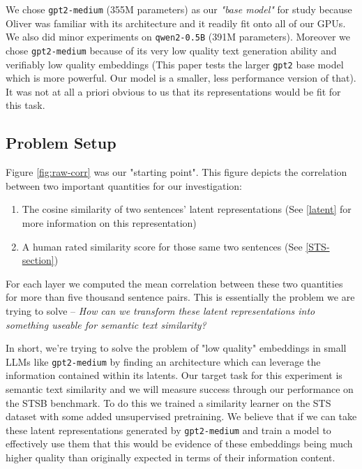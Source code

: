 \documentclass{article}
\begin{document}
\begin{enumerate}
\end{enumerate}
We chose \verb|gpt2-medium| (355M parameters) as our \textit{"base model"} for study because Oliver was familiar with its architecture and it readily fit onto all of our GPUs. We also did minor experiments on \verb|qwen2-0.5B| (391M parameters). Moreover we chose \verb|gpt2-medium| because of its very low quality text generation ability and verifiably low quality embeddings \cite{ethayarajh2019contextualcontextualizedwordrepresentations} (This paper tests the larger \verb|gpt2| base model which is more powerful. Our model is a smaller, less performance version of that). It was not at all a priori obvious to us that its representations would be fit for this task.


\subsection{Problem Setup} \label{Setup}
Figure \ref{fig:raw-corr} was our "starting point". This figure depicts the correlation between two important quantities for our investigation:
\begin{enumerate}
    \item The cosine similarity of two sentences' latent representations (See \ref{latent} for more information on this representation)
    \item A human rated similarity score for those same two sentences (See \ref{STS-section})
\end{enumerate}
For each layer we computed the mean correlation between these two quantities for more than five thousand sentence pairs. This is essentially the problem we are trying to solve -- \textit{How can we transform these latent representations into something useable for semantic text similarity?}

In short, we're trying to solve the problem of "low quality" embeddings in small LLMs like \verb|gpt2-medium| by finding an architecture which can leverage the information contained within its latents. Our target task for this experiment is semantic text similarity and we will measure success through our performance on the STSB \cite{STS} benchmark. To do this we trained a similarity learner on the STS dataset with some added unsupervised pretraining. We believe that if we can take these latent representations generated by \verb|gpt2-medium| and train a model to effectively use them that this would be evidence of these embeddings being much higher quality than originally expected in terms of their information content.
\end{document}
